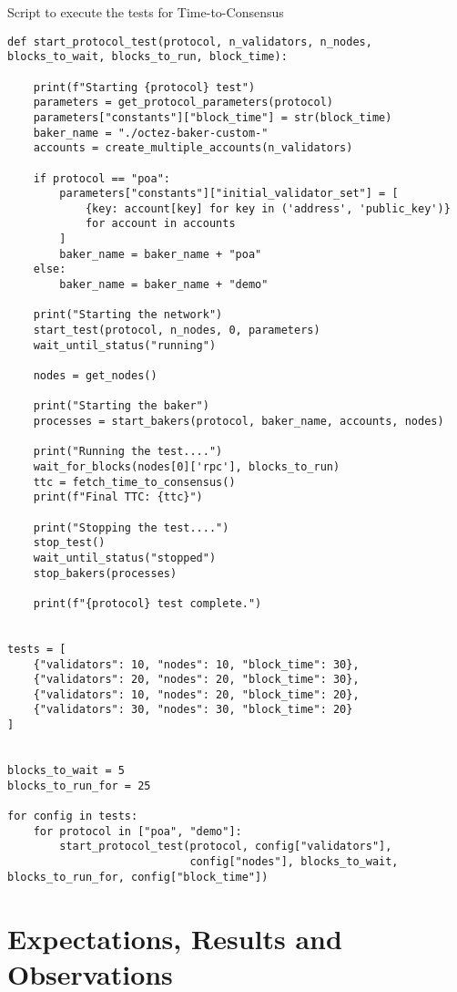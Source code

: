 \begin{listing}[H]
\caption{Script to execute the tests for Time-to-Consensus}
\label{lst:python_code}
\begin{verbatim}
def start_protocol_test(protocol, n_validators, n_nodes, blocks_to_wait, blocks_to_run, block_time):

    print(f"Starting {protocol} test")
    parameters = get_protocol_parameters(protocol)
    parameters["constants"]["block_time"] = str(block_time)
    baker_name = "./octez-baker-custom-"
    accounts = create_multiple_accounts(n_validators)

    if protocol == "poa":
        parameters["constants"]["initial_validator_set"] = [
            {key: account[key] for key in ('address', 'public_key')}
            for account in accounts
        ]
        baker_name = baker_name + "poa"
    else:
        baker_name = baker_name + "demo"

    print("Starting the network")
    start_test(protocol, n_nodes, 0, parameters)
    wait_until_status("running")

    nodes = get_nodes()

    print("Starting the baker")
    processes = start_bakers(protocol, baker_name, accounts, nodes)

    print("Running the test....")
    wait_for_blocks(nodes[0]['rpc'], blocks_to_run)
    ttc = fetch_time_to_consensus()
    print(f"Final TTC: {ttc}")

    print("Stopping the test....")
    stop_test()
    wait_until_status("stopped")
    stop_bakers(processes)

    print(f"{protocol} test complete.")


tests = [
    {"validators": 10, "nodes": 10, "block_time": 30},
    {"validators": 20, "nodes": 20, "block_time": 30},
    {"validators": 10, "nodes": 20, "block_time": 20},
    {"validators": 30, "nodes": 30, "block_time": 20}
]


blocks_to_wait = 5
blocks_to_run_for = 25

for config in tests:
    for protocol in ["poa", "demo"]:
        start_protocol_test(protocol, config["validators"],
                            config["nodes"], blocks_to_wait, blocks_to_run_for, config["block_time"])
\end{verbatim}
\end{listing}


\section*{Expectations, Results and Observations}

